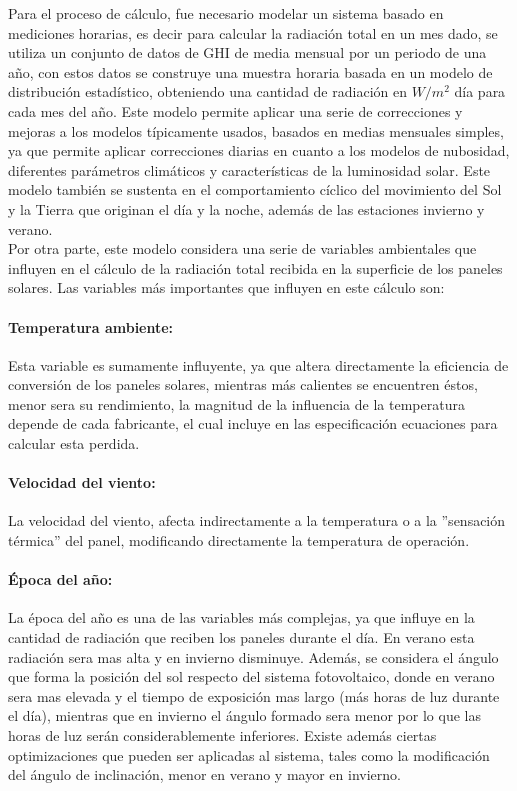 Para el proceso de cálculo, fue necesario modelar un sistema basado en mediciones horarias, es decir para calcular la radiación total en un mes dado, se utiliza un conjunto de datos de GHI de media mensual por un periodo de una año, con estos datos se construye una muestra horaria basada en un modelo de distribución estadístico, obteniendo una cantidad de radiación en $W/m^2$ día para cada mes del año. Este modelo permite aplicar una serie de correcciones y mejoras a los modelos típicamente usados, basados en medias mensuales simples, ya que permite aplicar correcciones diarias en cuanto a los modelos de nubosidad, diferentes parámetros climáticos y características de la luminosidad solar. Este modelo también se sustenta en el comportamiento cíclico del movimiento del Sol y la Tierra que originan el día y la noche, además de las estaciones invierno y verano.\\

Por otra parte, este modelo considera una serie de variables ambientales que influyen en el cálculo de la radiación total recibida en la superficie de los paneles solares. Las variables más importantes que influyen en este cálculo son:

\paragraph{Temperatura ambiente:}
Esta variable es sumamente influyente, ya que altera directamente la eficiencia de conversión de los paneles solares, mientras más calientes se encuentren éstos, menor sera su rendimiento, la magnitud de la influencia de la temperatura depende de cada fabricante, el cual incluye en las especificación ecuaciones para calcular esta perdida.

\paragraph{Velocidad del viento:}
La velocidad del viento, afecta indirectamente a la temperatura o a la ''sensación térmica'' del panel, modificando directamente la temperatura de operación.

\paragraph{Época del año:}
La época del año es una de las variables más complejas, ya que influye en la cantidad de radiación que reciben los paneles durante el día. En verano esta radiación sera mas alta y en invierno disminuye. Además, se considera el ángulo que forma la posición del sol respecto del sistema fotovoltaico, donde en verano sera mas elevada y el tiempo de exposición mas largo (más horas de luz durante el día), mientras que en invierno el ángulo formado sera menor por lo que las horas de luz serán considerablemente inferiores. Existe además ciertas optimizaciones que pueden ser aplicadas al sistema, tales como la modificación del ángulo de inclinación, menor en verano y mayor en invierno.

